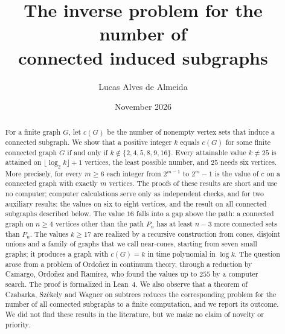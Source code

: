 \documentclass[11pt]{amsart}
\theoremstyle{definition}
\theoremstyle{remark}
\begin{document}
\title[The number of connected induced subgraphs]{The inverse problem for the number of\\ connected induced subgraphs}

\author{Lucas Alves de Almeida}
\address{Independent researcher}

\date{November 2026}



\begin{abstract}
For a finite graph $G$, let $c(G)$ be the number of nonempty vertex sets that induce a connected subgraph. We show that a positive integer $k$ equals $c(G)$ for some finite connected graph $G$ if and only if $k\notin\{2,4,5,8,9,16\}$. Every attainable value $k\ne25$ is attained on $\lfloor\log_2k\rfloor+1$ vertices, the least possible number, and $25$ needs six vertices. More precisely, for every $m\ge6$ each integer from $2^{m-1}$ to $2^m-1$ is the value of $c$ on a connected graph with exactly $m$ vertices. The proofs of these results are short and use no computer; computer calculations serve only as independent checks, and for two auxiliary results: the values on six to eight vertices, and the result on all connected subgraphs described below. The value $16$ falls into a gap above the path: a connected graph on $n\ge4$ vertices other than the path $P_n$ has at least $n-3$ more connected sets than $P_n$. The values $k\ge17$ are realized by a recursive construction from cones, disjoint unions and a family of graphs that we call near-cones, starting from seven small graphs; it produces a graph with $c(G)=k$ in time polynomial in $\log k$. The question arose from a problem of Ordo\~nez in continuum theory, through a reduction by Camargo, Ordo\~nez and Ram\'irez, who found the values up to $255$ by a computer search. The proof is formalized in Lean~4. We also observe that a theorem of Czabarka, Sz\'ekely and Wagner on subtrees reduces the corresponding problem for the number of all connected subgraphs to a finite computation, and we report its outcome. We did not find these results in the literature, but we make no claim of novelty or priority.
\end{abstract}

\maketitle
\end{document}
